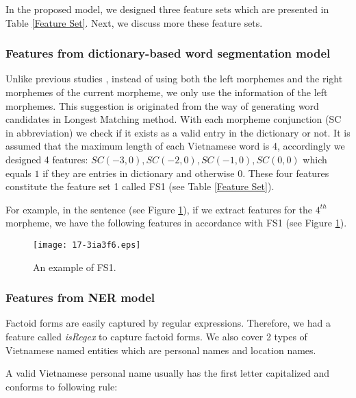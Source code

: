 \documentclass[english]{jnlp_1.4}
\begin{document}
In the proposed model, we designed three feature sets which are presented in Table {\ref{Feature Set}}.
Next, we discuss more these feature sets.


\subsubsection{Features from dictionary-based word segmentation model}

   Unlike previous studies \cite{CamTu07,Dien06,Dien01}, instead of using both the left
morphemes and the right morphemes of the current morpheme, we only use the
information of the left morphemes. This suggestion is originated from the way of
generating word candidates in Longest Matching method. With each morpheme conjunction (SC in abbreviation)
we check if it exists as a valid entry in the dictionary or not. It is assumed that the
maximum length of each Vietnamese word is 4, accordingly we designed 4
features: $SC(-3,0), SC(-2,0), SC(-1,0), SC(0,0)$ which equals $1$ if they
are entries in dictionary and otherwise $0$. These four features constitute the feature set 1 called FS1 (see Table \ref{Feature Set}).

For example, in the sentence (see Figure \ref{f13}),
if we extract features for the $4^{th}$ morpheme, we have the following features in accordance with FS1
(see Figure \ref{f13}).

\begin{figure}[b]
\begin{center}
\texttt{[image: 17-3ia3f6.eps]}
\caption{An example of FS1.}
\label{f13}
\end{center}
\end{figure}


\subsubsection{Features from NER model}

    Factoid forms are easily captured by regular expressions.
Therefore, we had a feature called \emph{isRegex} to capture factoid forms. We also cover 2 types of Vietnamese
named entities which are personal names and location names.

A valid Vietnamese personal name usually has the first letter capitalized and conforms to following rule:
\end{document}
